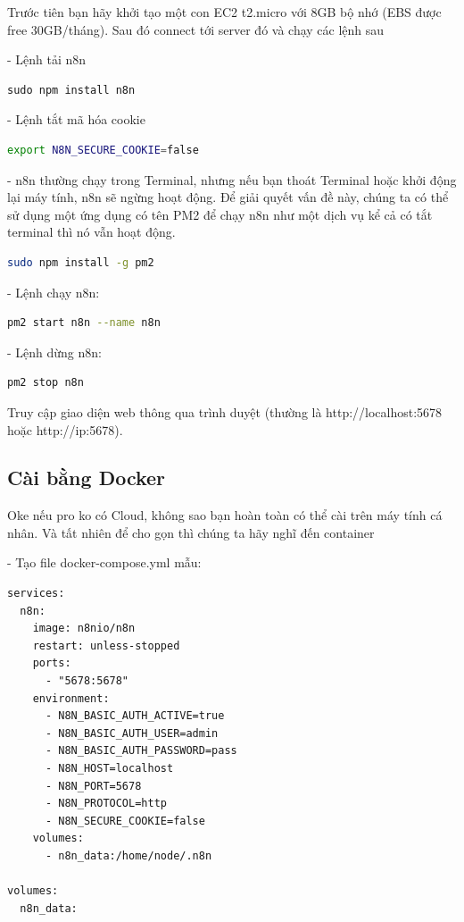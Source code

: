 Trước tiên bạn hãy khởi tạo một con EC2 t2.micro với 8GB bộ nhớ (EBS được free 30GB/tháng). Sau đó connect tới server đó và chạy các lệnh sau

- Lệnh tải n8n

\begin{lstlisting}
sudo npm install n8n
\end{lstlisting}

- Lệnh tắt mã hóa cookie

\begin{lstlisting}[language=bash]
export N8N_SECURE_COOKIE=false
\end{lstlisting}

- n8n thường chạy trong Terminal, nhưng nếu bạn thoát Terminal hoặc khởi động lại máy tính, n8n sẽ ngừng hoạt động. Để giải quyết vấn đề này, chúng ta có thể sử dụng một ứng dụng có tên PM2 để chạy n8n như một dịch vụ kể cả có tắt terminal thì nó vẫn hoạt động. 

\begin{lstlisting}[language=bash]
sudo npm install -g pm2
\end{lstlisting}

- Lệnh chạy n8n:
\begin{lstlisting}[language=bash]
pm2 start n8n --name n8n
\end{lstlisting}

- Lệnh dừng n8n:
\begin{lstlisting}[language=bash]
pm2 stop n8n
\end{lstlisting}

Truy cập giao diện web thông qua trình duyệt (thường là http://localhost:5678 hoặc http://ip:5678).



\subsection{Cài bằng Docker}
Oke nếu pro ko có Cloud, không sao bạn hoàn toàn có thể cài trên máy tính cá nhân. Và tất nhiên để cho gọn thì chúng ta hãy nghĩ đến container

- Tạo file docker-compose.yml mẫu:
\begin{lstlisting}
services:
  n8n:
    image: n8nio/n8n
    restart: unless-stopped
    ports:
      - "5678:5678"
    environment:
      - N8N_BASIC_AUTH_ACTIVE=true
      - N8N_BASIC_AUTH_USER=admin
      - N8N_BASIC_AUTH_PASSWORD=pass
      - N8N_HOST=localhost
      - N8N_PORT=5678
      - N8N_PROTOCOL=http
      - N8N_SECURE_COOKIE=false
    volumes:
      - n8n_data:/home/node/.n8n

volumes:
  n8n_data:
\end{lstlisting}

